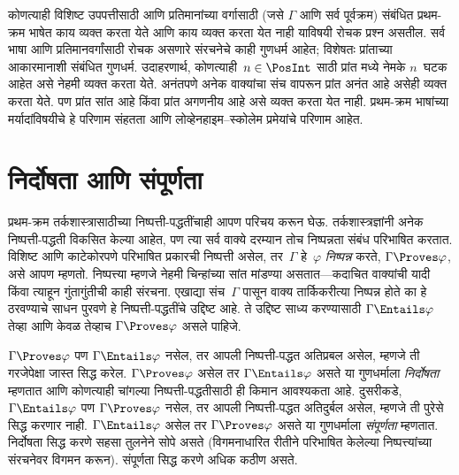 कोणत्याही विशिष्ट उपपत्तीसाठी आणि प्रतिमानांच्या वर्गासाठी (जसे
$\Gamma$ आणि सर्व पूर्वक्रम) संबंधित प्रथम-क्रम भाषेत काय व्यक्त करता
येते आणि काय व्यक्त करता येत नाही याविषयी रोचक प्रश्न असतील. सर्व भाषा
आणि प्रतिमानवर्गांसाठी रोचक असणारे संरचनेचे काही गुणधर्म आहेत;
विशेषतः प्रांताच्या आकारमानाशी संबंधित गुणधर्म. उदाहरणार्थ,
कोणत्याही~$n \in \PosInt$ साठी प्रांत मध्ये नेमके
$n$~घटक आहेत असे नेहमी व्यक्त करता येते. अनंतपणे अनेक
वाक्यांचा संच वापरून प्रांत अनंत आहे असेही व्यक्त करता येते.
पण प्रांत सांत आहे किंवा प्रांत अगणनीय आहे असे व्यक्त करता
येत नाही. प्रथम-क्रम भाषांच्या मर्यादांविषयीचे हे परिणाम संहतता आणि
लोव्हेनहाइम--स्कोलेम प्रमेयांचे परिणाम आहेत.












\section{निर्दोषता आणि संपूर्णता}\label{fol:int:scp:sec}

प्रथम-क्रम तर्कशास्त्रासाठीच्या निष्पत्ती-पद्धतींचाही आपण परिचय करून
घेऊ. तर्कशास्त्रज्ञांनी अनेक निष्पत्ती-पद्धती विकसित केल्या आहेत,
पण त्या सर्व वाक्ये दरम्यान तोच निष्पन्नता संबंध परिभाषित
करतात. विशिष्ट आणि काटेकोरपणे परिभाषित प्रकारची निष्पत्ती असेल,
तर~$\Gamma$ हे~$\varphi$ \emph{निष्पन्न} करते, $\Gamma \Proves \varphi$, असे
आपण म्हणतो. निष्पत्त्या म्हणजे नेहमी चिन्हांच्या सांत मांडण्या
असतात---कदाचित वाक्यांची यादी किंवा त्याहून गुंतागुंतीची काही
संरचना. एखाद्या संच~$\Gamma$ पासून वाक्य तार्किकरीत्या निष्पन्न
होते का हे ठरवण्याचे साधन पुरवणे हे निष्पत्ती-पद्धतींचे उद्दिष्ट
आहे. ते उद्दिष्ट साध्य करण्यासाठी $\Gamma \Entails \varphi$ तेव्हा आणि केवळ
तेव्हाच $\Gamma \Proves \varphi$ असले पाहिजे.

$\Gamma \Proves \varphi$ पण $\Gamma \Entails \varphi$ नसेल, तर आपली
निष्पत्ती-पद्धत अतिप्रबल असेल, म्हणजे ती गरजेपेक्षा जास्त सिद्ध
करेल. $\Gamma \Proves \varphi$ असेल तर $\Gamma \Entails \varphi$ असते या
गुणधर्माला \emph{निर्दोषता} म्हणतात आणि कोणत्याही चांगल्या
निष्पत्ती-पद्धतीसाठी ही किमान आवश्यकता आहे. दुसरीकडे,
$\Gamma \Entails \varphi$ पण $\Gamma \Proves \varphi$ नसेल, तर आपली
निष्पत्ती-पद्धत अतिदुर्बल असेल, म्हणजे ती पुरेसे सिद्ध करणार नाही.
$\Gamma \Entails \varphi$ असेल तर $\Gamma \Proves \varphi$ असते या गुणधर्माला
\emph{संपूर्णता} म्हणतात. निर्दोषता सिद्ध करणे सहसा तुलनेने सोपे असते
(विगमनाधारित रीतीने परिभाषित केलेल्या निष्पत्त्यांच्या संरचनेवर
विगमन करून). संपूर्णता सिद्ध करणे अधिक कठीण असते.

